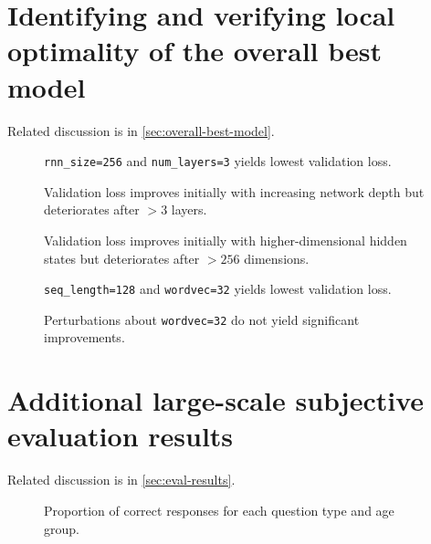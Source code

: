 \section{Identifying and verifying local optimality of the overall best model}

Related discussion is in \vref{sec:overall-best-model}.

\begin{center}
  \label{tab:torch-rnn-config-perfs}
  
  \addtocounter{table}{-1}%
\end{center}

\begin{figure}[htbp]
    \centering
    
    \caption{\texttt{rnn\_size=256} and \texttt{num\_layers=3} yields lowest validation loss.}
    \label{fig:torch-rnn-network-params}
\end{figure}

\begin{figure}[htbp]
  \centering
  
  \caption{Validation loss improves initially with increasing network depth but deteriorates after $>3$ layers.}
  \label{fig:torch-rnn-network-params-num-layers}
\end{figure}

\begin{figure}[htbp]
  \centering
  
  \caption{Validation loss improves initially with higher-dimensional hidden states
  but deteriorates after $>256$ dimensions.}
  \label{fig:torch-rnn-network-params-rnn-size}
\end{figure}

\begin{figure}[htbp]
    \centering
    
    \caption{\texttt{seq\_length=128} and \texttt{wordvec=32} yields lowest validation loss.}
    \label{fig:torch-rnn-input-params}
\end{figure}

\begin{figure}[htbp]
  \centering
  
  \caption{Perturbations about \texttt{wordvec=32} do not yield significant improvements.}
  \label{fig:torch-rnn-input-params-wordvec}
\end{figure}

\section{Additional large-scale subjective evaluation results}

Related discussion is in \vref{sec:eval-results}.

\begin{figure}[htbp]
  \centering
  
  \caption{Proportion of correct responses for each question type and age group.}
  \label{fig:responses-mask-agegroup}
\end{figure}


